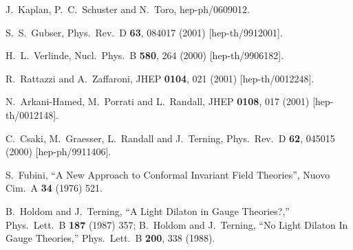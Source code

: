 \documentclass[12pt]{article}
\begin{document}
\begin{thebibliography}{99}
  J.~Kaplan, P.~C.~Schuster and N.~Toro,
  hep-ph/0609012.
  

  

  S.~S.~Gubser,
  Phys.\ Rev.\ D {\bf 63}, 084017 (2001)
  [hep-th/9912001].
  
  H.~L.~Verlinde,
  Nucl.\ Phys.\ B {\bf 580}, 264 (2000)
  [hep-th/9906182].
  
  
  R.~Rattazzi and A.~Zaffaroni,
  JHEP {\bf 0104}, 021 (2001)
  [hep-th/0012248].
  
  
  N.~Arkani-Hamed, M.~Porrati and L.~Randall,
  JHEP {\bf 0108}, 017 (2001)
  [hep-th/0012148].
  
  C.~Csaki, M.~Graesser, L.~Randall and J.~Terning,
  Phys.\ Rev.\ D {\bf 62}, 045015 (2000)
  [hep-ph/9911406].
  
  
  S.~Fubini,
  ``A New Approach to Conformal Invariant Field Theories'',
  Nuovo Cim.\ A {\bf 34} (1976) 521.


  B.~Holdom and J.~Terning,
  ``A Light Dilaton in Gauge Theories?,''
  Phys.\ Lett.\ B {\bf 187} (1987) 357;
B.~Holdom and J.~Terning,
  ``No Light Dilaton In Gauge Theories,''
  Phys.\ Lett.\ B {\bf 200}, 338 (1988).


\end{thebibliography}
\end{document}
